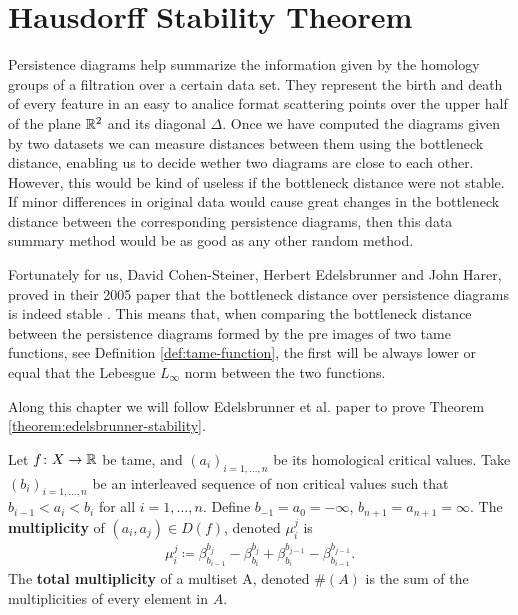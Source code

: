 \chapter{Hausdorff Stability Theorem}

Persistence diagrams help summarize the information given by the homology groups of a filtration over a certain data set. They represent the birth and death of every feature in an easy to analice format scattering points over the upper half of the plane $\mathbb R^2 $ and its diagonal $ \Delta $. Once we have computed the diagrams given by two datasets we can measure distances between them using the bottleneck distance, enabling us to decide wether two diagrams are close to each other. However, this would be kind of useless if the bottleneck distance were not stable. If minor differences in original data would cause great changes in the bottleneck distance between the corresponding persistence diagrams, then this data summary method would be as good as any other random method.

Fortunately for us, David Cohen-Steiner, Herbert Edelsbrunner and John Harer, proved in their 2005 paper that the bottleneck distance over persistence diagrams is indeed stable \cite{Edelsbrunner}. This means that, when comparing the bottleneck distance between the persistence diagrams formed by the pre images of two tame functions, see Definition \ref{def:tame-function}, the first will be always lower or equal that the Lebesgue $L_\infty$ norm between the two functions.

Along this chapter we will follow Edelsbrunner et al. paper \cite{Edelsbrunner} to prove Theorem \ref{theorem:edelsbrunner-stability}.

\begin{definition}[Multiplicity]
    Let $f \colon X \to \mathbb R $ be tame, and $ (a_i)_{i = 1, \dots, n} $ be its homological critical values. Take $ (b_i)_{i = 1, \dots, n} $ be an interleaved sequence of non critical values such that $ b_{i-1} < a_i < b_i $ for all $ i = 1, \dots, n $. Define $ b_{-1} = a_0 = -\infty $, $b_{n+1} = a_{n+1} = \infty $. The {\bf multiplicity} of $ (a_i, a_j) \in D(f) $, denoted $ \mu_i^j $ is
    \begin{align}
        \mu_i^j \coloneq \beta_{b_{i-1}}^{b_j} - \beta_{b_{i}}^{b_j} + \beta_{b_{i}}^{b_{j-1}} - \beta_{b_{i-1}}^{b_{j-1}}.
    \end{align}
    The {\bf total multiplicity} of a multiset A, denoted $ \#(A) $ is the sum of the multiplicities of every element in $A$.
\end{definition}

